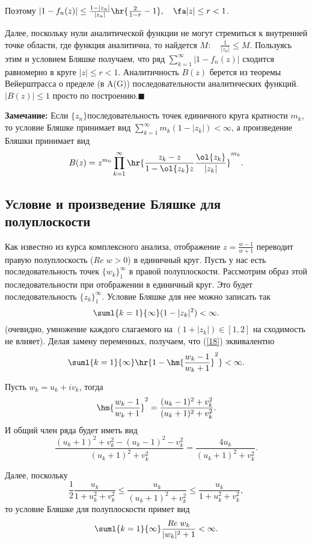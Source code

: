 \documentclass[a4paper]{article}
\begin{document}
Поэтому
$|1-f_n(z)|\le\frac{1-|z_n|}{|z_n|}\hr{\frac2{1-r}-1},\quad\fa
|z|\le r<1$.

Далее, поскольку нули аналитической функции не могут стремиться к внутренней точке области, где функция
аналитична, то найдется $M:\quad \frac1{|z_n|}\le M$. Пользуясь этим и условием Бляшке получаем, что ряд
$\sum_{k=1}^{\infty}|1-f_n(z)|$ сходится равномерно в круге $|z|\le r<1$. Аналитичность $B(z)$ берется из
теоремы Вейерштрасса о пределе (в A(G)) последовательности аналитических функций. $|B(z)|\le1$ просто по
построению.$\blacksquare$

\noindent\textbf{Замечание:} Если $\{z_n\}$\т последовательность
точек единичного круга кратности $m_k$, то условие Бляшке
принимает вид $\sum_{k=1}^{\infty} m_k(1-|z_k|)<\infty$, а
произведение Бляшки принимает вид
$$B(z)=z^{m_0}\prod\limits_{k=1}^{\infty}\hr{\frac{z_k-z}{1-\ol{z_k}z}\frac{\ol{z_k}}{|z_k|}}^{m_k}.$$

\subsection{Условие и произведение Бляшке для полуплоскости}
Как известно из курса комплексного анализа, отображение
$z=\frac{w-1}{w+1}$ переводит правую полуплоскость ($Re\;w>0$) в
единичный круг. Пусть у нас есть последовательность точек
$\{w_k\}_1^{\infty}$ в правой полуплоскости. Рассмотрим образ этой
последовательности при отображении в единичный круг. Это будет
последовательность $\{z_k\}_1^{\infty}$. Условие Бляшке для нее
можно записать так
\begin{equation}\label{18}
\suml{k=1}{\infty}(1-|z_k|^2)<\infty.
\end{equation}
(очевидно, умножение каждого слагаемого на $(1+|z_k|)\in[1,2]$ на
сходимость не влияет). Делая замену переменных, получаем, что
(\ref{18}) эквивалентно
\begin{equation}
\suml{k=1}{\infty}\hr{1-\hm{\frac{w_k-1}{w_k+1}}^2}<\infty.
\end{equation}

Пусть $w_k=u_k+iv_k$, тогда
$$\hm{\frac{w_k-1}{w_k+1}}^2=\frac{(u_k-1)^2+v_k^2}{(u_k+1)^2+v_k^2}.$$
И общий член ряда будет иметь вид
$$\frac{(u_k+1)^2+v_k^2-(u_k-1)^2-v_k^2}{(u_k+1)^2+v_k^2}=\frac{4u_k}{(u_k+1)^2+v_k^2}.$$

Далее, поскольку
$$\frac12\frac{u_k}{1+u_k^2+v_k^2}\le\frac{u_k}{(u_k+1)^2+v_k^2}\le\frac{u_k}{1+u_k^2+v_k^2},$$
то условие Бляшке для полуплоскости примет вид
\begin{equation}\label{19}
\suml{k=1}{\infty} \frac{Re\;w_k}{|w_k|^2+1}<\infty.
\end{equation}
\end{document}
